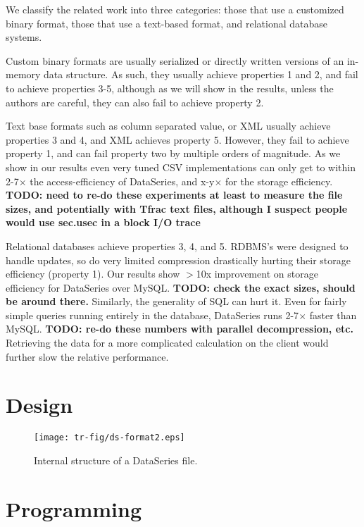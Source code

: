 \documentclass{acm_proc_article-sp}
\begin{document}
We classify the related work into three categories:
those that use a customized binary format, those that use a
text-based format, and relational database systems. 

Custom binary formats are usually serialized or directly written
versions of an in-memory data structure.  As such, they usually
achieve properties 1 and 2, and fail to achieve properties 3-5,
although as we will show in the results, unless the authors are
careful, they can also fail to achieve property 2.

Text base formats such as column separated value, or XML usually
achieve properties 3 and 4, and XML achieves property 5.  However,
they fail to achieve property 1, and can fail property two by multiple
orders of magnitude.  As we show in our results even very tuned CSV
implementations can only get to within 2-7$\times$ the
access-efficiency of DataSeries, and x-y$\times$ for the storage
efficiency.  {\bf TODO: need to re-do these experiments at least to
measure the file sizes, and potentially with Tfrac text files,
although I suspect people would use sec.usec in a block I/O trace}

Relational databases achieve properties 3, 4, and 5. RDBMS's were
designed to handle updates, so do very limited compression drastically
hurting their storage efficiency (property 1).  Our results show
$>$10x improvement on storage efficiency for DataSeries over
MySQL. {\bf TODO: check the exact sizes, should be around there.}
Similarly, the generality of SQL can hurt it.  Even for fairly simple
queries running entirely in the database, DataSeries runs 2-7$\times$
faster than MySQL. {\bf TODO: re-do these numbers with parallel
decompression, etc.}  Retrieving the data for a more complicated
calculation on the client would further slow the relative performance.

\section{Design}\label{sec:design}

\begin{figure*}
\hfil\texttt{[image: tr-fig/ds-format2.eps]}\hfil
\caption{Internal structure of a DataSeries file. }
\label{fig:dsorg}
\end{figure*}

\section{Programming}\label{sec:programming}
\end{document}
